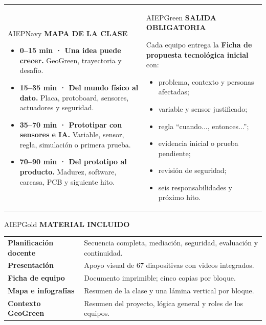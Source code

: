 \documentclass[9.5pt,a4paper]{article}
\newcommand{\labelx}[1]{{\scriptsize\bfseries\color{AIEPRed}\MakeUppercase{#1}}\par}
\begin{document}
\begin{tabularx}{\textwidth}{Y Y}
\begin{boxa}[height=61mm,valign=top]{AIEPNavy}
\labelx{Mapa de la clase}
\begin{itemize}
  \item \textbf{0–15 min · Una idea puede crecer.} GeoGreen, trayectoria y desafío.
  \item \textbf{15–35 min · Del mundo físico al dato.} Placa, protoboard, sensores, actuadores y seguridad.
  \item \textbf{35–70 min · Prototipar con sensores e IA.} Variable, sensor, regla, simulación o primera prueba.
  \item \textbf{70–90 min · Del prototipo al producto.} Madurez, software, carcasa, PCB y siguiente hito.
\end{itemize}
\end{boxa}
&
\begin{boxa}[height=61mm,valign=top]{AIEPGreen}
\labelx{Salida obligatoria}
Cada equipo entrega la \textbf{Ficha de propuesta tecnológica inicial} con:
\begin{itemize}
  \item problema, contexto y personas afectadas;
  \item variable y sensor justificado;
  \item regla “cuando..., entonces...”;
  \item evidencia inicial o prueba pendiente;
  \item revisión de seguridad;
  \item seis responsabilidades y próximo hito.
\end{itemize}
\end{boxa}
\end{tabularx}

\begin{boxa}{AIEPGold}
\labelx{Material incluido}
\begin{tabularx}{\textwidth}{@{}L{43mm}Y@{}}
\textbf{Planificación docente} & Secuencia completa, mediación, seguridad, evaluación y continuidad.\\
\textbf{Presentación} & Apoyo visual de 67 diapositivas con videos integrados.\\
\textbf{Ficha de equipo} & Documento imprimible; cinco copias por bloque.\\
\textbf{Mapa e infografías} & Resumen de la clase y una lámina vertical por bloque.\\
\textbf{Contexto GeoGreen} & Resumen del proyecto, lógica general y roles de los equipos.\\
\end{tabularx}
\end{boxa}
\end{document}
